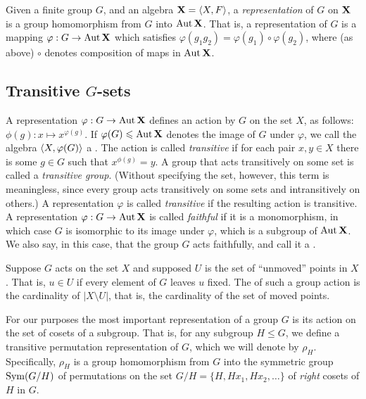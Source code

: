 Given a finite group $G$, and an algebra $\mathbf{X} = \langle X, F\rangle$, a
%
\emph{representation} of $G$ on $\mathbf{X}$ is a group homomorphism
from $G$ into $\operatorname{Aut}\mathbf{X}$.  That is, a representation of $G$ is a mapping
$\varphi : G \rightarrow \operatorname{Aut}\mathbf{X}$ which satisfies $\varphi(g_1 g_2) =
\varphi(g_1) \circ \varphi(g_2)$, where (as above) $\circ$ denotes composition
of maps in $\operatorname{Aut}\mathbf{X}$.

\subsection{Transitive $G$-sets}
A representation $\varphi : G \rightarrow \operatorname{Aut}\mathbf{X}$ defines an action by $G$ on the
set $X$, as follows: $\phi(g): x \mapsto x^{\varphi(g)}$.  If $\varphi(G) \leqslant
\operatorname{Aut}\mathbf{X}$
denotes the image of $G$ under $\varphi$, we call the algebra $\langle X, \varphi(G)\rangle$
a .
The action is called
%
\emph{transitive} if for each pair $x, y \in X$ there is some $g\in
G$ such that $x^{\phi(g)} = y$. 
A group that acts transitively on some set is called a 
%
\emph{transitive group}.
(Without specifying the set, however, this term is meaningless, since
every group acts transitively on some sets and intransitively on others.)
A representation $\varphi$ is called \emph{transitive} if the resulting action
is transitive. 
A representation  $\varphi : G \rightarrow \operatorname{Aut}\mathbf{X}$ is called 
\emph{faithful}
%
if it is a monomorphism, in which case $G$ is isomorphic to its image under
$\varphi$, which is a subgroup of $\operatorname{Aut}\mathbf{X}$.  We also say, in this case, that
the group $G$ acts faithfully, and call it a .

Suppose $G$ acts on the set $X$ and supposed $U$ is the set of ``unmoved''
points in $X$.  That is, $u\in U$ if every element of $G$ leaves $u$ fixed.
The  of such a group action is the cardinality of
$|X\setminus U|$, that is, the cardinality of the set of moved points.

For our purposes the most important representation of a group $G$ is its action 
on the set of cosets of a subgroup.  That is, for any subgroup $H\leq G$,
we define a transitive permutation representation of $G$, which we
will denote by $\rho_H$.  Specifically, $\rho_H$ is a group homomorphism
from $G$ into the symmetric group $\operatorname{Sym}(G/H)$ of permutations on the set $G/H =
\{H, Hx_1, Hx_2, \dots \}$ of \emph{right} cosets of $H$ in $G$.  

